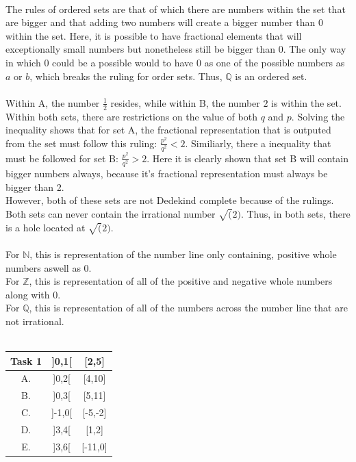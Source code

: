 \documentclass[12pt]{article}
\begin{document}
\\

The rules of ordered sets are that of which there are numbers within the set that are bigger and that adding two numbers will create a bigger number than $0$ within the set.
Here, it is possible to have fractional elements that will exceptionally small numbers but nonetheless still be bigger than $0$. 
The only way in which $0$ could be a possible would to have $0$ as one of the possible numbers as $a$ or $b$, which breaks the ruling for order sets.
Thus, $\mathbb{Q}$ is an ordered set.\\

\\

Within A, the number $\frac{1}{2}$ resides, while within B, the number $2$ is within the set.\\

Within both sets, there are restrictions on the value of both $q$ and $p$. 
Solving the inequality shows that for set A, the fractional representation that is outputed from the set must follow this ruling: $\frac{p^2}{q^2} < 2$.
Similiarly, there a inequality that must be followed for set B: $\frac{p^2}{q^2} > 2$. 
Here it is clearly shown that set B will contain bigger numbers always, because it's fractional representation must always be bigger than 2.\\

However, both of these sets are not Dedekind complete because of the rulings. 
Both sets can never contain the irrational number $\sqrt(2)$. 
Thus, in both sets, there is a hole located at $\sqrt(2)$.\\

\\

For $\mathbb{N}$, this is representation of the number line only containing, positive whole numbers aswell as $0$.\\

For $\mathbb{Z}$, this is representation of all of the positive and negative whole numbers along with $0$.\\

For $\mathbb{Q}$, this is representation of all of the numbers across the number line that are not irrational.\\

\\

\begin{center}
	\begin{tabular}{| c c c |}
	\hline
		Task 1 & ]0,1[ & [2,5]\\
	\hline\hline
		A. & ]0,2[ & [4,10]\\
	\hline
		B. & ]0,3[ & [5,11]\\
	\hline 
		C. & ]-1,0[ & [-5,-2]\\
	\hline
		D. & ]3,4[ & [1,2]\\
	\hline
		E. & ]3,6[ & [-11,0]\\
	\hline
	\end{tabular}
\end{center}
\end{document}
